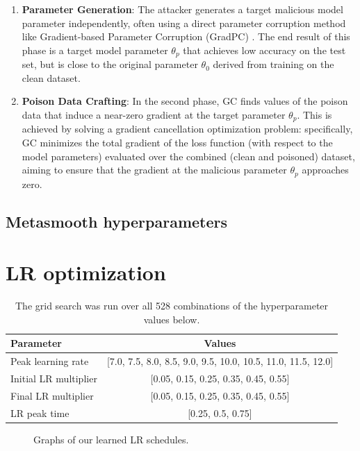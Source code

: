 \documentclass{article}
\begin{document}
\begin{enumerate}
  \item \textbf{Parameter Generation}: The attacker generates a target malicious model
  parameter independently, often using a direct parameter corruption method like
  Gradient-based Parameter Corruption (GradPC) \citep{lu2023exploring}. 
  The end result of this phase is a target model parameter $\theta_p$
  that achieves low accuracy on the test set, but is close to the original
  parameter $\theta_0$ derived from training on the clean dataset.

  \item \textbf{Poison Data Crafting}: In the second phase, GC finds values of the poison 
  data that induce a near-zero gradient at the target parameter $\theta_p$.
  This is achieved by solving a gradient cancellation optimization
  problem: specifically, GC minimizes the total gradient of the loss function
  (with respect to the model parameters) evaluated over the combined (clean and
  poisoned) dataset, aiming to ensure that the gradient at the malicious parameter
  $\theta_p$ approaches zero. 
\end{enumerate}

\subsection{Metasmooth hyperparameters}
\begin{table}[h]
  \caption{Hyperparameters used in the ResNet-9 \citep{jordan202494}
    CIFAR-10 poisoning experiments.  The augmentations used are
  normalization, random horizontal flip, and random translate (2 pixels)}
  \centering
  
\end{table}

\clearpage
\section{LR optimization}
\label{app:lr_opt}

\begin{table}[h]
  \caption{The grid search was run over all 528 combinations of the
  hyperparameter values below.}
  \centering
  \begin{tabular}{l c} \toprule
    \textbf{Parameter} & \textbf{Values} \\
    \midrule
    Peak learning rate & [7.0, 7.5, 8.0, 8.5, 9.0, 9.5, 10.0, 10.5,
    11.0, 11.5, 12.0] \\
    Initial LR multiplier & [0.05, 0.15, 0.25, 0.35, 0.45, 0.55] \\
    Final LR multiplier & [0.05, 0.15, 0.25, 0.35, 0.45, 0.55] \\
    LR peak time & [0.25, 0.5, 0.75] \\
    \bottomrule
  \end{tabular}
  \label{tab:lr_grid_hparams}
\end{table}

\begin{figure}[h]
  \centering
  
  \caption{Graphs of our learned LR schedules.}
  \label{fig:lr_sched_plot}
\end{figure}
\end{document}
